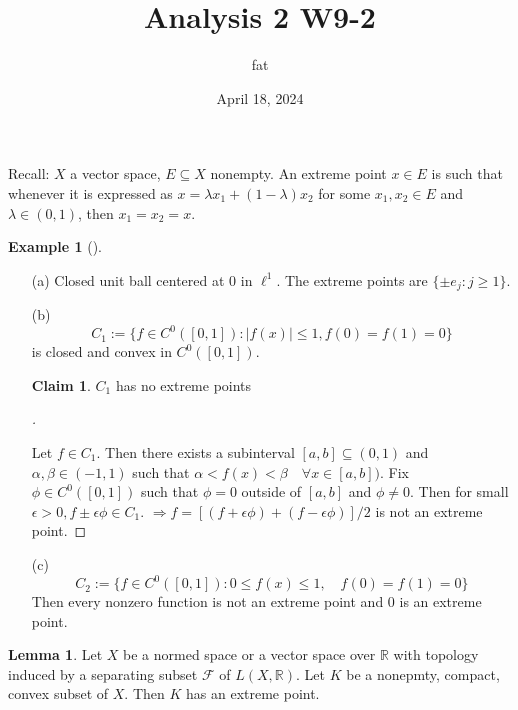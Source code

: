 \documentclass{article}
\title{Analysis 2 W9-2}
\author{fat}
\date{April 18, 2024}
\theoremstyle{definition}
\newtheorem{ex}{Example}
\newtheorem{lem}{Lemma}
\newtheorem*{clm}{Claim}
\newenvironment{proofs}[1][\proofname]{%
  \begin{proof}[#1]$ $\par\nobreak\ignorespaces
}{%
  \end{proof}
}
\newenvironment{exs}[1][]{%
  \begin{ex}[#1]$ $\par\nobreak\ignorespaces
}{%
  \end{ex}
}
\newcommand{\F}{\mathcal F}
\newcommand{\RR}{\mathbb R}
\newcommand{\Ra}{\Rightarrow}
\begin{document}
\maketitle
\thispagestyle{fancy}
\renewcommand{\footrulewidth}{0.4pt}
\cfoot{\thepage}
\renewcommand{\headrulewidth}{0.4pt}

Recall: $X$ a vector space, $E \subseteq X$ nonempty.
An extreme point $x \in E$ is such that whenever it is expressed as $x = \lambda x_1 + (1 - \lambda)x_2$ for some $x_1, x_2 \in E$ and $\lambda \in (0, 1)$, then $x_1 = x_2 = x$.

\begin{exs}
	\begin{enumerate}
		\item[(a)] Closed unit ball centered at 0 in $\ell^1$.
			The extreme points are $\{\pm e_j: j \geq 1\}$.

		\item[(b)] 
			\[
				C_1 := \{ f \in C^0([0, 1]): |f(x)| \leq 1, f(0) = f(1) = 0\}
			\]
			is closed and convex in $C^0([0, 1])$.
			\begin{clm}
				$C_1$ has no extreme points
			\end{clm}
			\begin{proofs}
				Let $f \in C_1$.
				Then there exists a subinterval $[a, b] \subseteq (0, 1)$ and $\alpha, \beta \in (-1, 1)$ such that $\alpha < f(x) < \beta \quad \forall x \in [a, b])$.
				Fix $\phi \in C^0([0, 1])$ such that $\phi = 0$ outside of $[a, b]$ and $\phi \neq 0$.
				Then for small $\epsilon > 0, f \pm \epsilon \phi \in C_1$.
				$\Ra f = [(f + \epsilon \phi) + (f - \epsilon \phi)]/2$ is not an extreme point.
			\end{proofs}

		\item[(c)] 
			\[
				C_2 := \{f \in C^0([0, 1]): 0 \leq f(x) \leq 1, \quad f(0) = f(1) = 0\}
			\]
			Then every nonzero function is not an extreme point and 0 is an extreme point.
	\end{enumerate}
\end{exs}

\begin{lem}
	Let $X$ be a normed space or a vector space over $\RR$ with topology induced by a separating subset $\F$ of $L(X, \RR)$.
	Let $K$ be a nonepmty, compact, convex subset of $X$.
	Then $K$ has an extreme point.
\end{lem}
\end{document}
